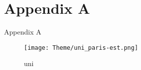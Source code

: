 
\chapter*{Appendix A}

Appendix A

\begin{figure}
    \texttt{[image: Theme/uni\_paris-est.png]}
    \caption{uni}
\end{figure}

\clearpage  %
